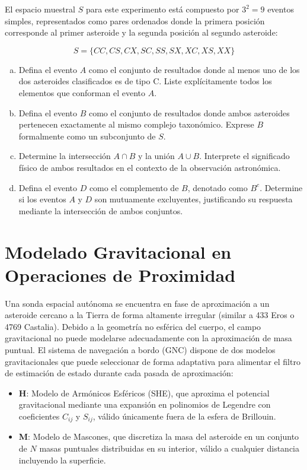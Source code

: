 \documentclass[a4paper]{article}
\begin{document}
El espacio muestral $S$ para este experimento está compuesto por $3^2 = 9$ eventos simples, representados como pares ordenados donde la primera posición corresponde al primer asteroide y la segunda posición al segundo asteroide:

$$
S = \{CC, CS, CX, SC, SS, SX, XC, XS, XX\}
$$

\begin{enumerate}[a)]
\item Defina el evento $A$ como el conjunto de resultados donde al menos uno de los dos asteroides clasificados es de tipo C. Liste explícitamente todos los elementos que conforman el evento $A$.
\item Defina el evento $B$ como el conjunto de resultados donde ambos asteroides pertenecen exactamente al mismo complejo taxonómico. Exprese $B$ formalmente como un subconjunto de $S$.
\item Determine la intersección $A \cap B$ y la unión $A \cup B$. Interprete el significado físico de ambos resultados en el contexto de la observación astronómica.
\item Defina el evento $D$ como el complemento de $B$, denotado como $B^c$. Determine si los eventos $A$ y $D$ son mutuamente excluyentes, justificando su respuesta mediante la intersección de ambos conjuntos.
\end{enumerate}

\section{Modelado Gravitacional en Operaciones de Proximidad}
\label{sec:problema-06}

Una sonda espacial autónoma se encuentra en fase de aproximación a un asteroide cercano a la Tierra de forma altamente irregular (similar a 433 Eros o 4769 Castalia). Debido a la geometría no esférica del cuerpo, el campo gravitacional no puede modelarse adecuadamente con la aproximación de masa puntual. El sistema de navegación a bordo (GNC) dispone de dos modelos gravitacionales que puede seleccionar de forma adaptativa para alimentar el filtro de estimación de estado durante cada pasada de aproximación:

\begin{itemize}
\item \textbf{H}: Modelo de Armónicos Esféricos (SHE), que aproxima el potencial gravitacional mediante una expansión en polinomios de Legendre con coeficientes $C_{ij}$ y $S_{ij}$, válido únicamente fuera de la esfera de Brillouin.
\item \textbf{M}: Modelo de Mascones, que discretiza la masa del asteroide en un conjunto de $N$ masas puntuales distribuidas en su interior, válido a cualquier distancia incluyendo la superficie.
\end{itemize}
\end{document}
